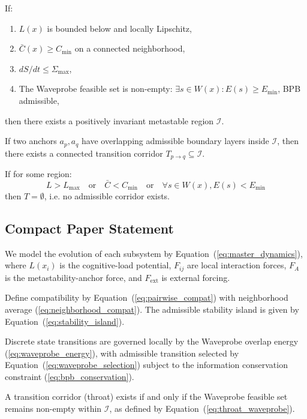 \documentclass[11pt,a4paper]{article}
\begin{document}
\begin{theorem}
If:
\begin{enumerate}
    \item $L(x)$ is bounded below and locally Lipschitz,
    \item $\bar{C}(x) \geq C_{\min}$ on a connected neighborhood,
    \item $dS/dt \leq \Sigma_{\max}$,
    \item The Waveprobe feasible set is non-empty: $\exists s \in W(x) : E(s) \geq E_{\min}$, BPB admissible,
\end{enumerate}
then there exists a positively invariant metastable region $\mathcal{I}$.
\end{theorem}

\begin{theorem}
If two anchors $a_p, a_q$ have overlapping admissible boundary layers inside $\mathcal{I}$, then there exists a connected transition corridor $T_{p \to q} \subseteq \mathcal{I}$.
\end{theorem}

\begin{theorem}
If for some region:
\begin{equation}
L > L_{\max} \quad \text{or} \quad \bar{C} < C_{\min} \quad \text{or} \quad \forall s \in W(x), E(s) < E_{\min}
\end{equation}
then $T = \emptyset$, i.e. no admissible corridor exists.
\end{theorem}

\subsection{Compact Paper Statement}

We model the evolution of each subsystem by Equation~(\ref{eq:master_dynamics}), where $L(x_i)$ is the cognitive-load potential, $F_{ij}$ are local interaction forces, $F_A$ is the metastability-anchor force, and $F_{\mathrm{ext}}$ is external forcing.

Define compatibility by Equation~(\ref{eq:pairwise_compat}) with neighborhood average (\ref{eq:neighborhood_compat}). The admissible stability island is given by Equation~(\ref{eq:stability_island}).

Discrete state transitions are governed locally by the Waveprobe overlap energy (\ref{eq:waveprobe_energy}), with admissible transition selected by Equation~(\ref{eq:waveprobe_selection}) subject to the information conservation constraint (\ref{eq:bpb_conservation}).

A transition corridor (throat) exists if and only if the Waveprobe feasible set remains non-empty within $\mathcal{I}$, as defined by Equation~(\ref{eq:throat_waveprobe}).
\end{document}

